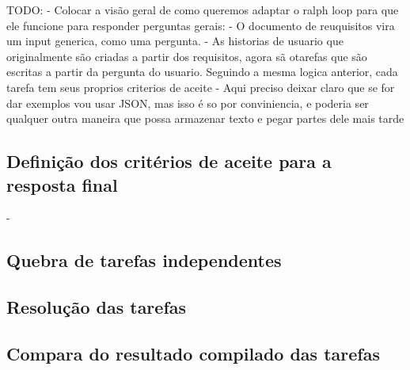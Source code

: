 TODO:
    - Colocar a visão geral de como queremos adaptar o ralph loop para que ele funcione para responder perguntas gerais:
        - O documento de reuquisitos vira um input generica, como uma pergunta.
        - As historias de usuario que originalmente são criadas a partir dos requisitos, agora sã otarefas que são escritas a partir da pergunta do usuario. Seguindo a mesma logica anterior, cada tarefa tem seus proprios criterios de aceite
        - Aqui preciso deixar claro que se for dar exemplos vou usar JSON, mas isso é so por conviniencia, e poderia ser qualquer outra maneira que possa armazenar texto e pegar partes dele mais tarde


\subsection{Definição dos critérios de aceite para a resposta final}
-


\subsection{Quebra de tarefas independentes}



\subsection{Resolução das tarefas}



\subsection{Compara do resultado compilado das tarefas}


